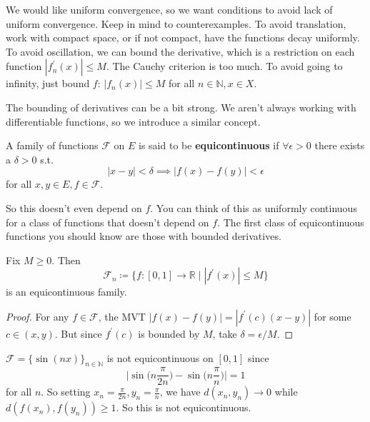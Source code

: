   We would like uniform convergence, so we want conditions to avoid lack of uniform convergence. Keep in mind to counterexamples. To avoid translation, work with compact space, or if not compact, have the functions decay uniformly. To avoid oscillation, we can bound the derivative, which is a restriction on each function $|f_n^\prime (x)| \leq M$. The Cauchy criterion is too much. To avoid going to infinity, just bound $f$: $|f_n (x)| \leq M$ for all $n \in \mathbb{N}, x \in X$. 

  The bounding of derivatives can be a bit strong. We aren't always working with differentiable functions, so we introduce a similar concept. 

  \begin{definition}
    A family of functions $\mathcal{F}$ on $E$ is said to be \textbf{equicontinuous} if $\forall \epsilon > 0$ there exists a $\delta > 0$ s.t. 
    \begin{equation}
      |x - y| < \delta \implies |f(x) - f(y)| < \epsilon
    \end{equation}
    for all $x, y \in E, f \in \mathcal{F}$. 
  \end{definition}

  So this doesn't even depend on $f$. You can think of this as uniformly continuous for a class of functions that doesn't depend on $f$. The first class of equicontinuous functions you should know are those with bounded derivatives. 

  \begin{lemma}
    Fix $M \geq 0$. Then 
    \begin{equation}
      \mathcal{F}_n \coloneqq \{f : [0, 1] \to \mathbb{R} \mid |f^\prime (x)| \leq M \} 
    \end{equation}
    is an equicontinuous family. 
  \end{lemma}
  \begin{proof}
    For any $f \in \mathcal{F}$, the MVT $|f(x) - f(y)| = |f^\prime (c) (x - y)|$ for some $c \in (x, y)$. But since $f^\prime (c)$ is bounded by $M$, take $\delta = \epsilon/M$. 
  \end{proof}

  \begin{example}
    $\mathcal{F} = \{\sin(nx)\}_{n \in \mathbb{N}}$ is not equicontinuous on $[0, 1]$ since 
    \begin{equation}
      \bigg| \sin\Big( n \frac{\pi}{2n} \Big) - \sin \Big( n \frac{\pi}{n} \Big) \bigg| = 1
    \end{equation}
    for all $n$. So setting $x_n = \frac{\pi}{2n}, y_n = \frac{\pi}{n}$, we have $d(x_n, y_n) \to 0$ while $d(f(x_n), f(y_n)) \geq 1$. So this is not equicontinuous. 
  \end{example} 

